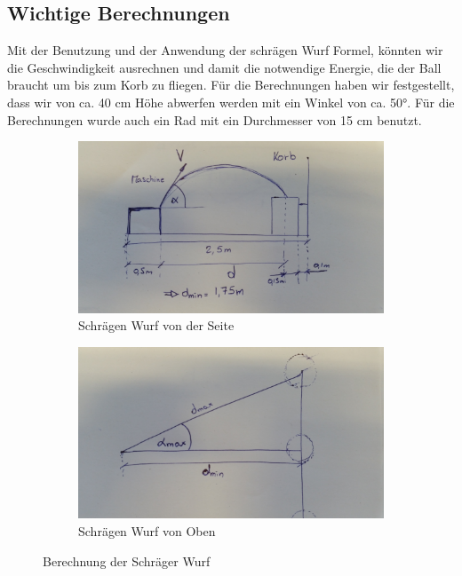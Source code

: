 \subsection{Wichtige Berechnungen}
Mit der Benutzung und der Anwendung der schrägen Wurf Formel, könnten wir die Geschwindigkeit ausrechnen und damit die notwendige Energie, 
die der Ball braucht um bis zum Korb zu fliegen. Für die Berechnungen haben wir festgestellt, dass wir von ca. 40 cm Höhe abwerfen werden 
mit ein Winkel von ca. 50°. Für die Berechnungen wurde auch ein Rad mit ein Durchmesser von 15 cm benutzt. \\

\begin{figure}[h!]
	\begin{subfigure}{.5\textwidth}
		\includegraphics[width=1\textwidth]{../../fig/Skizze_Berechnung_1.jpg}
		\caption{Schrägen Wurf von der Seite}
		\label{fig:Berechnungen von die Geschwindigkeit}
	\end{subfigure} %
	\begin{subfigure}{.5\textwidth}
		\includegraphics[width=1\textwidth]{../../fig/Skizze_Berechnung_2.jpg}
		\caption{Schrägen Wurf von Oben}
		\label{fig:Berechnungen von die Geschwindigkeit}
	\end{subfigure}
	\caption{Berechnung der Schräger Wurf}
	\label{Berechnungen}
\end{figure}

